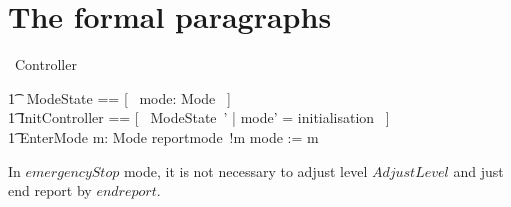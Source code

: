 \documentclass{report} %
\begin{document}
\section{The formal paragraphs}

\begin{circus}
    \circprocess\ Controller \circdef \circbegin \\
\end{circus}
\begin{circusaction}
        \t1 \circstate\ ModeState == [~ mode: Mode ~] \\
        \t1 InitController == [~ ModeState~' | mode' = initialisation ~] \\
        \t1 EnterMode \circdef m: Mode \circspot reportmode~!m \then mode := m \\
\end{circusaction}
In $emergencyStop$ mode, it is not necessary to adjust level $AdjustLevel$ and just end report by $endreport$.
\end{document}
